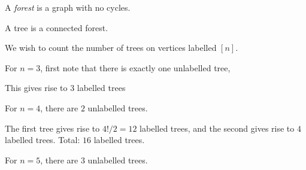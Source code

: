 \begin{definition} \label{def:forest}
    A \emph{forest} is a graph with no cycles.
\end{definition}
A tree is a connected forest.

We wish to count the number of trees on vertices labelled $[n]$.
\begin{examples}
    \item For $n = 3$, first note that there is exactly one unlabelled
    tree,
    \begin{center}
    \end{center}
    This gives rise to $3$ labelled trees
    \begin{center}
        \quad
        \quad
    \end{center}
    \item For $n = 4$, there are $2$ unlabelled trees.
    \begin{center}
        \quad
    \end{center}
    The first tree gives rise to $4!/2 = 12$ labelled trees, and the
    second gives rise to $4$ labelled trees.
    Total: $16$ labelled trees.
    \item For $n = 5$, there are $3$ unlabelled trees.
    \begin{center}

\end{center}
\end{examples}
